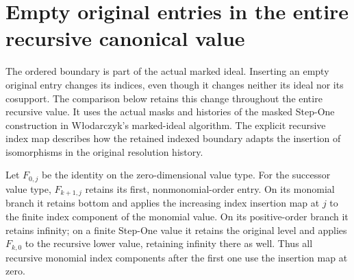 \section{Empty original entries in the entire recursive canonical value}
The ordered boundary is part of the actual marked ideal. Inserting an empty
original entry changes its indices, even though it changes neither its ideal
nor its cosupport. The comparison below retains this change throughout the
entire recursive value. It uses the actual masks and histories of the masked
Step-One construction in W\l odarczyk's marked-ideal algorithm. The explicit
recursive index map describes how the retained indexed boundary adapts the
insertion of isomorphisms in the original resolution history.

\begin{definition}
\label{hir:original-invariant-empty-map}
\leanok
{}
Let $F_{0,j}$ be the identity on the zero-dimensional value type. For the
successor value type, $F_{k+1,j}$ retains its first, nonmonomial-order entry.
On its monomial branch it retains bottom and applies the increasing index
insertion map at $j$ to the finite index component of the monomial value. On its positive-order
branch it retains infinity; on a finite Step-One value it retains the original
level and applies $F_{k,0}$ to the recursive lower value, retaining infinity
there as well. Thus all recursive monomial index components after the first
one use the insertion map at zero.
\end{definition}

